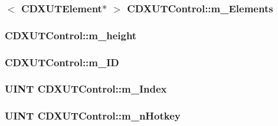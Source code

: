 \label{class_c_d_x_u_t_control_a9673eef8fa31de9e182f9a48d8b8cd16}
\hypertarget{class_c_d_x_u_t_control_a8401888c4830d5cc2ff08ebf4289c255}{
\subsubsection[{m\_\-Elements}]{$<$ {\bf CDXUTElement}$\ast$ $>$ {\bf CDXUTControl::m\_\-Elements}}}
\label{class_c_d_x_u_t_control_a8401888c4830d5cc2ff08ebf4289c255}
\hypertarget{class_c_d_x_u_t_control_a6b29c74ead25395f0a2870c74b6bd336}{
\subsubsection[{m\_\-height}]{ {\bf CDXUTControl::m\_\-height}}}
\label{class_c_d_x_u_t_control_a6b29c74ead25395f0a2870c74b6bd336}
\hypertarget{class_c_d_x_u_t_control_a4388cb300910f7f8feb339e05a8caace}{
\subsubsection[{m\_\-ID}]{ {\bf CDXUTControl::m\_\-ID}}}
\label{class_c_d_x_u_t_control_a4388cb300910f7f8feb339e05a8caace}
\hypertarget{class_c_d_x_u_t_control_a800474d07b3db99c726b586b5d4b945a}{
\subsubsection[{m\_\-Index}]{\setlength{\rightskip}{0pt plus 5cm}UINT {\bf CDXUTControl::m\_\-Index}}}
\label{class_c_d_x_u_t_control_a800474d07b3db99c726b586b5d4b945a}
\hypertarget{class_c_d_x_u_t_control_a0acdf7fe9bc8465ec53ea1a90346cd9b}{
\subsubsection[{m\_\-nHotkey}]{\setlength{\rightskip}{0pt plus 5cm}UINT {\bf CDXUTControl::m\_\-nHotkey}}}
